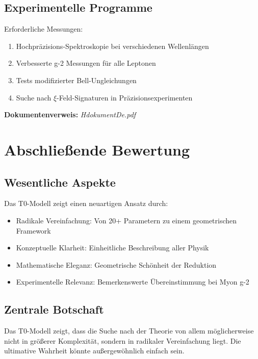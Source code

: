 \documentclass[12pt,a4paper]{article}
\newcommand{\xipar}{\xi}
\begin{document}
	\subsection{Experimentelle Programme}
	
	Erforderliche Messungen:
	
	\begin{enumerate}
		\item Hochpräzisions-Spektroskopie bei verschiedenen Wellenlängen
		\item Verbesserte g-2 Messungen für alle Leptonen
		\item Tests modifizierter Bell-Ungleichungen
		\item Suche nach $\xipar$-Feld-Signaturen in Präzisionsexperimenten
	\end{enumerate}
	
	\textbf{Dokumentenverweis:} \textit{HdokumentDe.pdf}
	
	\section{Abschließende Bewertung}
	
	\subsection{Wesentliche Aspekte}
	
	Das T0-Modell zeigt einen neuartigen Ansatz durch:
	
	\begin{itemize}
		\item Radikale Vereinfachung: Von 20+ Parametern zu einem geometrischen Framework
		\item Konzeptuelle Klarheit: Einheitliche Beschreibung aller Physik
		\item Mathematische Eleganz: Geometrische Schönheit der Reduktion
		\item Experimentelle Relevanz: Bemerkenswerte Übereinstimmung bei Myon g-2
	\end{itemize}
	
	\subsection{Zentrale Botschaft}
	
	Das T0-Modell zeigt, dass die Suche nach der Theorie von allem möglicherweise nicht in größerer Komplexität, sondern in radikaler Vereinfachung liegt. Die ultimative Wahrheit könnte außergewöhnlich einfach sein.
	
\end{document}
